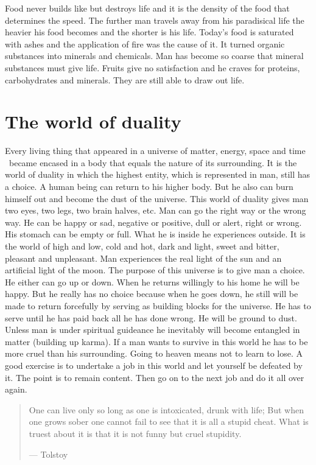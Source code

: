 \documentclass[landscape,twocolumn,letterpaper]{article}
\newcommand{\mest}{matter, energy, space and time }
\begin{document}
Food never builds like but destroys life and it is the density of the
food that determines the speed. The further man travels away from his
paradisical life the heavier his food becomes and the shorter is his
life. Today's food is saturated with ashes and the application of fire
was the cause of it. It turned organic substances into minerals and
chemicals. Man has become so coarse that mineral substances must give
life. Fruits give no satisfaction and he craves for proteins,
carbohydrates and minerals. They are still able to draw out life.


\section{The world of duality}
\label{sec:twod}

Every living thing that appeared in a universe of \mest\  became encased
in a body that equals the nature of its surrounding. It is the world
of duality in which the highest entity, which is represented in man,
still has a choice. A human being can return to his higher body. But
he also can burn himself out and become the dust of the universe. This
world of duality gives man two eyes, two legs, two brain halves,
etc. Man can go the right way or the wrong way. He can be happy or
sad, negative or positive, dull or alert, right or wrong. His stomach
can be empty or full. What he is inside he experiences outside. It is
the world of high and low, cold and hot, dark and light, sweet and
bitter, pleasant and unpleasant. Man experiences the real light of the
sun and an artificial light of the moon. The purpose of this universe
is to give man a choice. He either can go up or down. When he returns
willingly to his home he will be happy. But he really has no choice
because when he goes down, he still will be made to return forcefully
by serving as building blocks for the universe. He has to serve until
he has paid back all he has done wrong. He will be ground to
dust. Unless man is under spiritual guideance he inevitably will
become entangled in matter (building up karma). If a man wants to
survive in this world he has to be more cruel than his
surrounding. Going to heaven means not to learn to lose. A good
exercise is to undertake a job in this world and let yourself be
defeated by it. The point is to remain content. Then go on to the next
job and do it all over again.

\begin{quote} One can live only so long as one is intoxicated, drunk
with life; But when one grows sober one cannot fail to see that it is
all a stupid cheat. What is truest about it is that it is not funny
but cruel stupidity.

--- Tolstoy
\end{quote}
\end{document}
